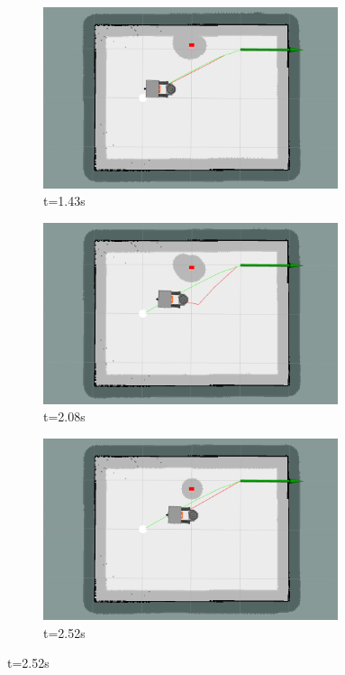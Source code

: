 \begin{figure}[H]
    \centering
    \begin{subfigure}[b]{0.30\linewidth}
        \centering
        \includegraphics[width=0.95\textwidth]{images/eband_single_1_obs/1/3143.png} \caption{t=1.43s}
    \end{subfigure}%
    \begin{subfigure}[b]{0.30\linewidth}
        \centering
        \includegraphics[width=0.95\textwidth]{images/eband_single_1_obs/1/3208.png} \caption{t=2.08s}\label{subfig:eband_test_case_1_exp_1_curve}
    \end{subfigure}%
    \begin{subfigure}[b]{0.30\linewidth}
        \centering
        \includegraphics[width=0.95\textwidth]{images/eband_single_1_obs/1/3252.png} \caption{t=2.52s}\label{subfig:eband_test_case_1_exp_1_blindspot}

\end{subfigure}
\end{figure}
